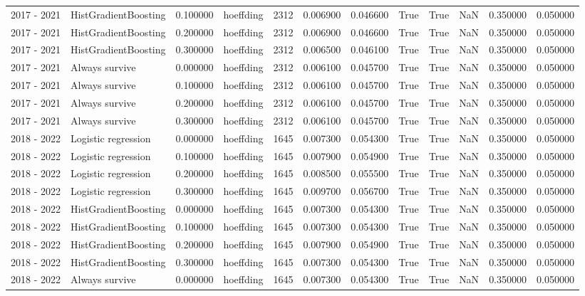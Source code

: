 \begin{tabular}{llrlrrrrrrrr}
2017 - 2021 & HistGradientBoosting & 0.100000 & hoeffding & 2312 & 0.006900 & 0.046600 & True & True & NaN & 0.350000 & 0.050000 \\
2017 - 2021 & HistGradientBoosting & 0.200000 & hoeffding & 2312 & 0.006900 & 0.046600 & True & True & NaN & 0.350000 & 0.050000 \\
2017 - 2021 & HistGradientBoosting & 0.300000 & hoeffding & 2312 & 0.006500 & 0.046100 & True & True & NaN & 0.350000 & 0.050000 \\
2017 - 2021 & Always survive & 0.000000 & hoeffding & 2312 & 0.006100 & 0.045700 & True & True & NaN & 0.350000 & 0.050000 \\
2017 - 2021 & Always survive & 0.100000 & hoeffding & 2312 & 0.006100 & 0.045700 & True & True & NaN & 0.350000 & 0.050000 \\
2017 - 2021 & Always survive & 0.200000 & hoeffding & 2312 & 0.006100 & 0.045700 & True & True & NaN & 0.350000 & 0.050000 \\
2017 - 2021 & Always survive & 0.300000 & hoeffding & 2312 & 0.006100 & 0.045700 & True & True & NaN & 0.350000 & 0.050000 \\
2018 - 2022 & Logistic regression & 0.000000 & hoeffding & 1645 & 0.007300 & 0.054300 & True & True & NaN & 0.350000 & 0.050000 \\
2018 - 2022 & Logistic regression & 0.100000 & hoeffding & 1645 & 0.007900 & 0.054900 & True & True & NaN & 0.350000 & 0.050000 \\
2018 - 2022 & Logistic regression & 0.200000 & hoeffding & 1645 & 0.008500 & 0.055500 & True & True & NaN & 0.350000 & 0.050000 \\
2018 - 2022 & Logistic regression & 0.300000 & hoeffding & 1645 & 0.009700 & 0.056700 & True & True & NaN & 0.350000 & 0.050000 \\
2018 - 2022 & HistGradientBoosting & 0.000000 & hoeffding & 1645 & 0.007300 & 0.054300 & True & True & NaN & 0.350000 & 0.050000 \\
2018 - 2022 & HistGradientBoosting & 0.100000 & hoeffding & 1645 & 0.007300 & 0.054300 & True & True & NaN & 0.350000 & 0.050000 \\
2018 - 2022 & HistGradientBoosting & 0.200000 & hoeffding & 1645 & 0.007900 & 0.054900 & True & True & NaN & 0.350000 & 0.050000 \\
2018 - 2022 & HistGradientBoosting & 0.300000 & hoeffding & 1645 & 0.007300 & 0.054300 & True & True & NaN & 0.350000 & 0.050000 \\
2018 - 2022 & Always survive & 0.000000 & hoeffding & 1645 & 0.007300 & 0.054300 & True & True & NaN & 0.350000 & 0.050000 \\

\end{tabular}
